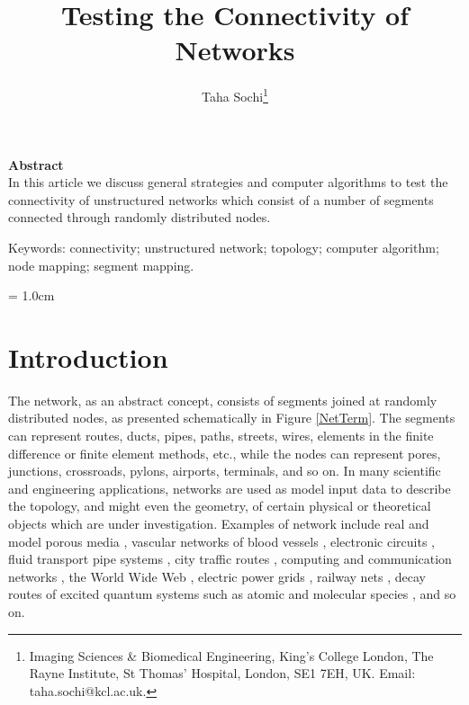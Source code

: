 \documentclass[a4paper,12pt]{article}
\title
{ \vspace*{3.0cm} \LARGE{\bf Testing the Connectivity of Networks} \vspace*{4.0cm} \\
}
\author{Taha Sochi\footnote{Imaging Sciences \& Biomedical Engineering, King's College London, The Rayne
Institute, St Thomas' Hospital, London, SE1 7EH, UK. Email: taha.sochi@kcl.ac.uk.} \vspace*{5.0cm}}
\begin{document}
\maketitle {}

\newpage
{} {} \tableofcontents

\newpage
{} {} \listoffigures


\newpage
{} {} \noindent
{\noindent \LARGE \bf Abstract} \vspace{0.5cm}\\
\noindent 
In this article we discuss general strategies and computer algorithms to test the connectivity of
unstructured networks which consist of a number of segments connected through randomly distributed
nodes.

\vspace{1cm}

Keywords: connectivity; unstructured network; topology; computer algorithm; node mapping; segment
mapping.

\pagestyle{headings} \addtolength{\headheight}{+1.6pt}
\rhead[{\bfseries\leftmark}]{{\bfseries\thepage}}
\headsep = 1.0cm

\newpage
\section{Introduction}

The network, as an abstract concept, consists of segments joined at randomly distributed nodes, as
presented schematically in Figure \ref{NetTerm}. The segments can represent routes, ducts, pipes,
paths, streets, wires, elements in the finite difference or finite element methods, etc., while the
nodes can represent pores, junctions, crossroads, pylons, airports, terminals, and so on. In many
scientific and engineering applications, networks are used as model input data to describe the
topology, and might even the geometry, of certain physical or theoretical objects which are under
investigation. Examples of network include real and model porous media \cite{SorbieCJ1989,
OrenBA1997, TsakiroglouTKPS2003, PerrinTSC2006, Sochithesis2007, SochiB2008}, vascular networks of
blood vessels \cite{SherwinFPP2003, RuanCZC2003, FormaggiaLTV2006, AlastrueyMPDPS2007}, electronic
circuits \cite{RouxH1987, Schilders2009, ZhanMT2009}, fluid transport pipe systems
\cite{RatnayakeJ1999, HammaDF2008, DobersekG2009}, city traffic routes \cite{BentleyL1980,
MessmerP1994, Ledoux1997}, computing and communication networks \cite{SarvothamRB2005,
JiangXCHX2011}, the World Wide Web \cite{SohY1998, BarabasiAJ2000, Sgroi2008}, electric power grids
\cite{CrucittiLM2004, ChassinP2005, LinY2011}, railway nets \cite{HuismanBD2002, MeesterM2007},
decay routes of excited quantum systems such as atomic and molecular species \cite{SochiEmis2010},
and so on.
\end{document}
